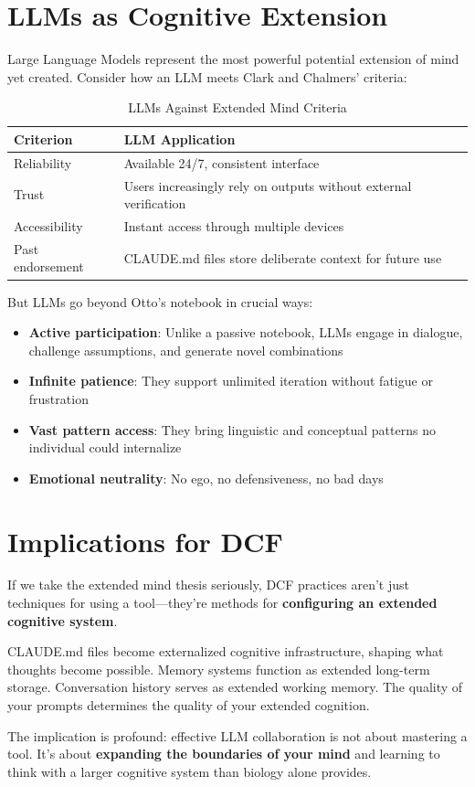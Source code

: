 \section{LLMs as Cognitive Extension}

Large Language Models represent the most powerful potential extension of mind yet created. Consider how an LLM meets Clark and Chalmers' criteria:

\begin{table}[H]
\centering
\begin{tabular}{ll}
\toprule
\textbf{Criterion} & \textbf{LLM Application} \\
\midrule
Reliability & Available 24/7, consistent interface \\
Trust & Users increasingly rely on outputs without external verification \\
Accessibility & Instant access through multiple devices \\
Past endorsement & CLAUDE.md files store deliberate context for future use \\
\bottomrule
\end{tabular}
\caption{LLMs Against Extended Mind Criteria}
\end{table}

But LLMs go beyond Otto's notebook in crucial ways:

\begin{itemize}
    \item \textbf{Active participation}: Unlike a passive notebook, LLMs engage in dialogue, challenge assumptions, and generate novel combinations
    \item \textbf{Infinite patience}: They support unlimited iteration without fatigue or frustration
    \item \textbf{Vast pattern access}: They bring linguistic and conceptual patterns no individual could internalize
    \item \textbf{Emotional neutrality}: No ego, no defensiveness, no bad days
\end{itemize}

\section{Implications for DCF}

If we take the extended mind thesis seriously, DCF practices aren't just techniques for using a tool---they're methods for \textbf{configuring an extended cognitive system}.

CLAUDE.md files become externalized cognitive infrastructure, shaping what thoughts become possible. Memory systems function as extended long-term storage. Conversation history serves as extended working memory. The quality of your prompts determines the quality of your extended cognition.

The implication is profound: effective LLM collaboration is not about mastering a tool. It's about \textbf{expanding the boundaries of your mind} and learning to think with a larger cognitive system than biology alone provides.
